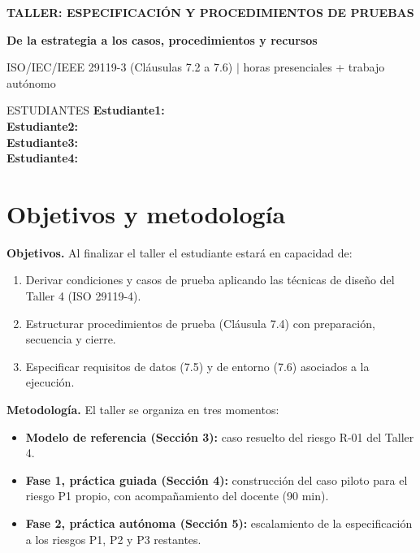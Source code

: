 \documentclass[11pt,a4paper]{article}
\newcommand{\campo}[1]{\textbf{#1}}
\begin{document}
\begin{center}
{\color{oscuro}\LARGE\bfseries TALLER: ESPECIFICACIÓN Y PROCEDIMIENTOS DE PRUEBAS}\par\vspace{6pt}
{\color{acento}\large\bfseries De la estrategia a los casos, procedimientos y recursos}\par\vspace{4pt}
ISO/IEC/IEEE 29119-3 (Cláusulas 7.2 a 7.6) \quad$|$ horas presenciales + trabajo autónomo
\end{center}

\begin{cajaacento}[white]{ESTUDIANTES}
\campo{Estudiante1:}\,\underline{}\\
\campo{Estudiante2:}\,\underline{}\\
\campo{Estudiante3:}\,\underline{}\\
\campo{Estudiante4:}\,\underline{}
\end{cajaacento}

\section{Objetivos y metodología}
\campo{Objetivos.} Al finalizar el taller el estudiante estará en capacidad de:
\begin{enumerate}
\item Derivar condiciones y casos de prueba aplicando las técnicas de diseño del Taller 4 (ISO 29119-4).
\item Estructurar procedimientos de prueba (Cláusula 7.4) con preparación, secuencia y cierre.
\item Especificar requisitos de datos (7.5) y de entorno (7.6) asociados a la ejecución.
\end{enumerate}
\campo{Metodología.} El taller se organiza en tres momentos:
\begin{itemize}
\item \campo{Modelo de referencia (Sección 3):} caso resuelto del riesgo R-01 del Taller 4.
\item \campo{Fase 1, práctica guiada (Sección 4):} construcción del caso piloto para el riesgo P1 propio, con acompañamiento del docente (90 min).
\item \campo{Fase 2, práctica autónoma (Sección 5):} escalamiento de la especificación a los riesgos P1, P2 y P3 restantes.
\end{itemize}
\end{document}
